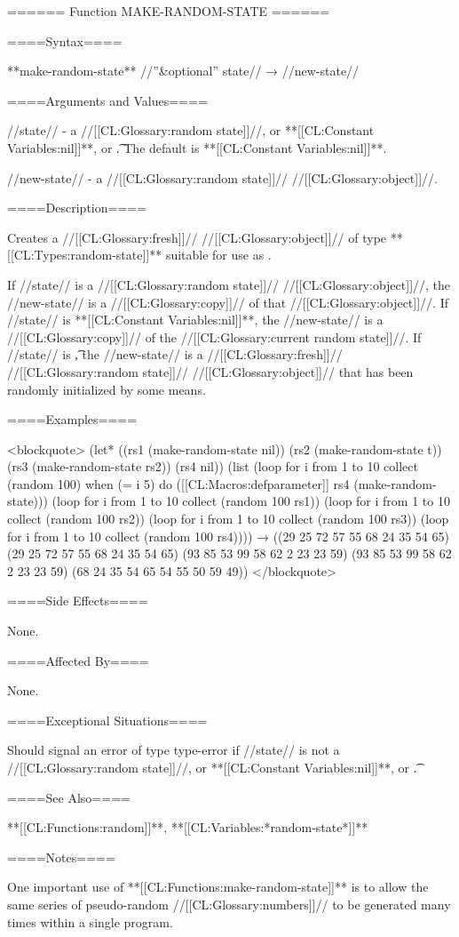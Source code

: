 ====== Function MAKE-RANDOM-STATE ======

====Syntax====

**make-random-state** //''&optional'' state// → //new-state//

====Arguments and Values====

//state// - a //[[CL:Glossary:random state]]//, or **[[CL:Constant Variables:nil]]**, or \t. The default is **[[CL:Constant Variables:nil]]**.

//new-state// - a //[[CL:Glossary:random state]]// //[[CL:Glossary:object]]//.

====Description====

Creates a //[[CL:Glossary:fresh]]// //[[CL:Glossary:object]]// of type **[[CL:Types:random-state]]** suitable for use as .

If //state// is a //[[CL:Glossary:random state]]// //[[CL:Glossary:object]]//, the //new-state// is a //[[CL:Glossary:copy]]// of that //[[CL:Glossary:object]]//. If //state// is **[[CL:Constant Variables:nil]]**, the //new-state// is a //[[CL:Glossary:copy]]// of the //[[CL:Glossary:current random state]]//. If //state// is \t, the //new-state// is a //[[CL:Glossary:fresh]]// //[[CL:Glossary:random state]]// //[[CL:Glossary:object]]// that has been randomly initialized by some means.

====Examples====

<blockquote> (let* ((rs1 (make-random-state nil)) (rs2 (make-random-state t)) (rs3 (make-random-state rs2)) (rs4 nil)) (list (loop for i from 1 to 10 collect (random 100) when (= i 5) do ([[CL:Macros:defparameter]] rs4 (make-random-state))) (loop for i from 1 to 10 collect (random 100 rs1)) (loop for i from 1 to 10 collect (random 100 rs2)) (loop for i from 1 to 10 collect (random 100 rs3)) (loop for i from 1 to 10 collect (random 100 rs4)))) → ((29 25 72 57 55 68 24 35 54 65) (29 25 72 57 55 68 24 35 54 65) (93 85 53 99 58 62 2 23 23 59) (93 85 53 99 58 62 2 23 23 59) (68 24 35 54 65 54 55 50 59 49)) </blockquote>

====Side Effects====

None.

====Affected By====

None.

====Exceptional Situations====

Should signal an error of type type-error if //state// is not a //[[CL:Glossary:random state]]//, or **[[CL:Constant Variables:nil]]**, or \t.

====See Also====

**[[CL:Functions:random]]**, **[[CL:Variables:*random-state*]]**

====Notes====

One important use of **[[CL:Functions:make-random-state]]** is to allow the same series of pseudo-random //[[CL:Glossary:numbers]]// to be generated many times within a single program.

